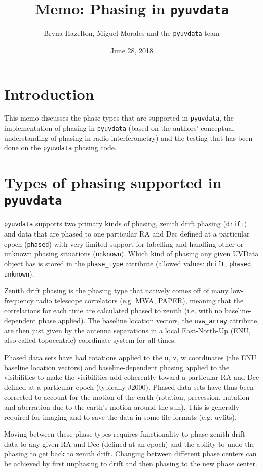 \documentclass[11pt, oneside]{article}   	%
\title{Memo: Phasing in \texttt{pyuvdata}}
\author{Bryna Hazelton, Miguel Morales and the \texttt{pyuvdata} team}
\date{June 28, 2018}							%
\begin{document}
\maketitle
\section{Introduction}
This memo discusses the phase types that are supported in \texttt{pyuvdata}, the implementation of phasing in \texttt{pyuvdata} (based on the authors' conceptual understanding of phasing in radio interferometry) and the testing that has been done on the \texttt{pyuvdata} phasing code.

\section{Types of phasing supported in \texttt{pyuvdata}}
\texttt{pyuvdata} supports two primary kinds of phasing, zenith drift phasing (\verb!drift!) and data that are phased to one particular RA and Dec defined at a particular epoch (\verb!phased!) with very limited support for labelling and handling other or unknown phasing situations (\verb!unknown!). Which kind of phasing any given UVData object has is stored in the \verb!phase_type! attribute (allowed values: \verb!drift!, \verb!phased!, \verb!unknown!).

Zenith drift phasing is the phasing type that natively comes off of many low-frequency radio telescope correlators (e.g. MWA, PAPER), meaning that the correlations for each time are calculated phased to zenith (i.e. with no baseline-dependent phase applied). The baseline location vectors, the \verb!uvw_array! attribute, are then just given by the antenna separations in a local East-North-Up (ENU, also called topocentric) coordinate system for all times.

Phased data sets have had rotations applied to the u, v, w coordinates (the ENU baseline location vectors) and baseline-dependent phasing applied to the visibilities to make the visibilities add coherently toward a particular RA and Dec defined at a particular epoch (typically J2000). Phased data sets have thus been corrected to account for the motion of the earth (rotation, precession, nutation and aberration due to the earth's motion around the sun). This is generally required for imaging and to save the data in some file formats (e.g. uvfits).

Moving between these phase types requires functionality to phase zenith drift data to any given RA and Dec (defined at an epoch) and the ability to undo the phasing to get back to zenith drift. Changing between different phase centers can be achieved by first unphasing to drift and then phasing to the new phase center.
\end{document}
